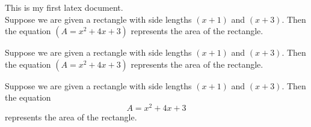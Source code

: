 \documentclass[11pt]{article}
\begin{document}
This is my first latex document.\\
Suppose we are given a rectangle with side lengths $(x+1)$ and $(x+3)$. Then the equation  $(A=x^2+4x+3)$ represents the area of the rectangle.

Suppose we are given a rectangle with side lengths $(x+1)$ and $(x+3)$. Then the equation  $(A=x^2+4x+3)$ represents the area of the rectangle.

Suppose we are given a rectangle with side lengths $(x+1)$ and $(x+3)$. Then the equation  $$A=x^2+4x+3$$ represents the area of the rectangle.
\end{document}
